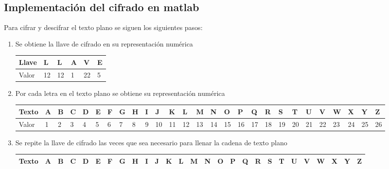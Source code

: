 \documentclass[10pt]{article}
\begin{document}
\subsection{Implementación del cifrado en matlab}      


  Para cifrar y descifrar el texto plano se siguen los siguientes pasos:
  \begin{enumerate}
    \item Se obtiene la llave de cifrado en su representación numérica 
    \begin{table}[h!]
      \begin{adjustbox}{width=0.3\columnwidth,center}
        \begin{tabular}{|l|l|l|l|l|l|}
      \hline
      Llave & L  & L  & A & V  & E \\ \hline
      Valor & 12 & 12 & 1 & 22 & 5 \\ \hline
    \end{tabular}
  \end{adjustbox}
\end{table}
    \item Por cada letra en el texto plano se obtiene su representación numérica
    \begin{table}[h]
      \begin{adjustbox}{width=1\columnwidth,center}
      \begin{tabular}{|l|l|l|l|l|l|l|l|l|l|l|l|l|l|l|l|l|l|l|l|l|l|l|l|l|l|l|}
      \hline
      Texto   & A  & B  & C & D  & E  & F  & G  & H & I  & J  & K  & L  & M  & N  & O  & P  & Q  & R  & S  & T  & U  & V  & W  & X  & Y  & Z  \\ \hline
      Valor   & 1  & 2  & 3 & 4  & 5  & 6  & 7  & 8 & 9  & 10 & 11 & 12 & 13 & 14 & 15 & 16 & 17 & 18 & 19 & 20 & 21 & 22 & 23 & 24 & 25 & 26 \\ \hline 
      \end{tabular}
    \end{adjustbox}
      \end{table}
  \item Se repite la llave de cifrado las veces que sea necesario para llenar la cadena de texto plano
  \begin{table}[h]
    \begin{adjustbox}{width=1\columnwidth,center}
      \begin{tabular}{|l|l|l|l|l|l|l|l|l|l|l|l|l|l|l|l|l|l|l|l|l|l|l|l|l|l|l|}
        \hline
        Texto   & A  & B  & C & D  & E  & F  & G  & H & I  & J  & K  & L  & M  & N  & O  & P  & Q  & R  & S  & T  & U  & V  & W  & X  & Y  & Z  \\ \hline

\end{tabular}
\end{adjustbox}
\end{table}
\end{enumerate}
\end{document}
